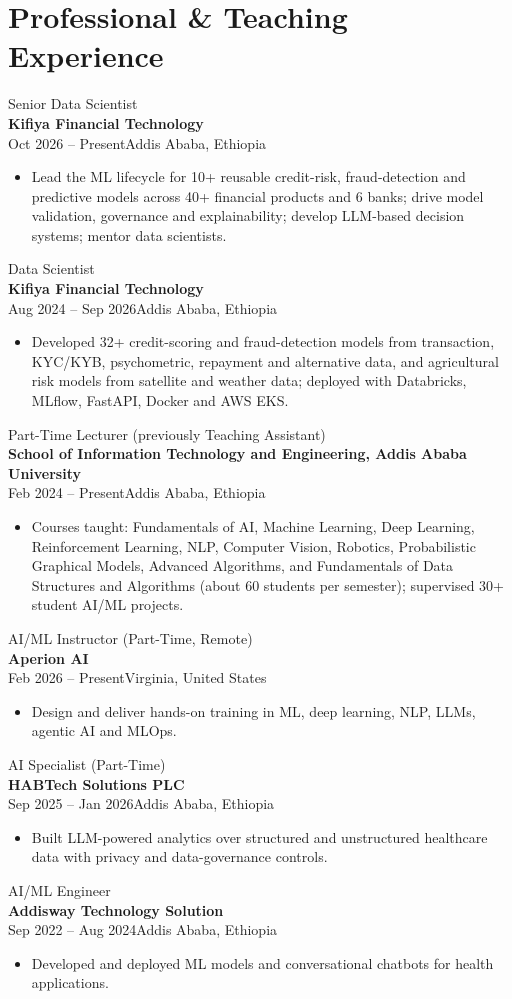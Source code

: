 \documentclass[10pt,a4paper]{article}
\newcommand{\entry}[4]{%
  {\large #1}\\[-1pt]
  {\color{accent}\bfseries #2}\\[-1pt]
  {\small\color{muted}#3\hfill #4}\par\vspace{1pt}}
\begin{document}
\clearpage
\section{Professional \& Teaching Experience}
\entry{Senior Data Scientist}{Kifiya Financial Technology}{Oct 2026 -- Present}{Addis Ababa, Ethiopia}
\begin{itemize}
  \item Lead the ML lifecycle for 10+ reusable credit-risk, fraud-detection and predictive models across 40+ financial products and 6 banks; drive model validation, governance and explainability; develop LLM-based decision systems; mentor data scientists.
\end{itemize}
\entry{Data Scientist}{Kifiya Financial Technology}{Aug 2024 -- Sep 2026}{Addis Ababa, Ethiopia}
\begin{itemize}
  \item Developed 32+ credit-scoring and fraud-detection models from transaction, KYC/KYB, psychometric, repayment and alternative data, and agricultural risk models from satellite and weather data; deployed with Databricks, MLflow, FastAPI, Docker and AWS EKS.
\end{itemize}
\entry{Part-Time Lecturer (previously Teaching Assistant)}{School of Information Technology and Engineering, Addis Ababa University}{Feb 2024 -- Present}{Addis Ababa, Ethiopia}
\begin{itemize}
  \item Courses taught: Fundamentals of AI, Machine Learning, Deep Learning, Reinforcement Learning, NLP, Computer Vision, Robotics, Probabilistic Graphical Models, Advanced Algorithms, and Fundamentals of Data Structures and Algorithms (about 60 students per semester); supervised 30+ student AI/ML projects.
\end{itemize}
\entry{AI/ML Instructor (Part-Time, Remote)}{Aperion AI}{Feb 2026 -- Present}{Virginia, United States}
\begin{itemize}
  \item Design and deliver hands-on training in ML, deep learning, NLP, LLMs, agentic AI and MLOps.
\end{itemize}
\entry{AI Specialist (Part-Time)}{HABTech Solutions PLC}{Sep 2025 -- Jan 2026}{Addis Ababa, Ethiopia}
\begin{itemize}
  \item Built LLM-powered analytics over structured and unstructured healthcare data with privacy and data-governance controls.
\end{itemize}
\entry{AI/ML Engineer}{Addisway Technology Solution}{Sep 2022 -- Aug 2024}{Addis Ababa, Ethiopia}
\begin{itemize}
  \item Developed and deployed ML models and conversational chatbots for health applications.
\end{itemize}
\end{document}

